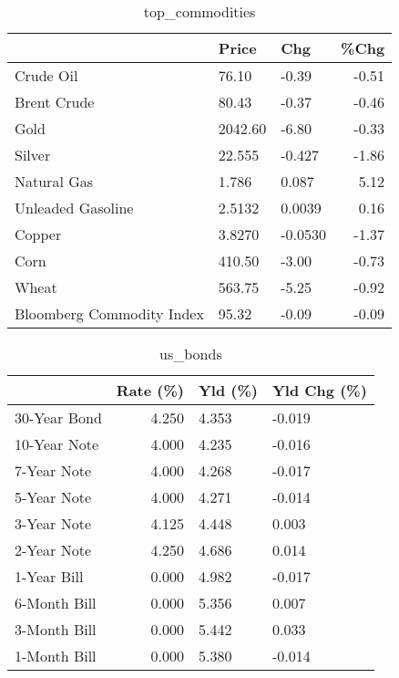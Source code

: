 \documentclass{article}%
\begin{document}
\begin{table}[htbp]%
\caption{top\_commodities}%
\centering%
\begin{adjustbox}{width=1\textwidth}%
\begin{tabular}{lllr}
\toprule
                          &   Price &     Chg &  \%Chg \\
\midrule
               Crude Oil  &   76.10 &   -0.39 & -0.51 \\
             Brent Crude  &   80.43 &   -0.37 & -0.46 \\
                    Gold  & 2042.60 &   -6.80 & -0.33 \\
                  Silver  &  22.555 &  -0.427 & -1.86 \\
             Natural Gas  &   1.786 &   0.087 &  5.12 \\
       Unleaded Gasoline  &  2.5132 &  0.0039 &  0.16 \\
                  Copper  &  3.8270 & -0.0530 & -1.37 \\
                    Corn  &  410.50 &   -3.00 & -0.73 \\
                   Wheat  &  563.75 &   -5.25 & -0.92 \\
Bloomberg Commodity Index &   95.32 &   -0.09 & -0.09 \\
\bottomrule
\end{tabular}
%
\end{adjustbox}%
\end{table}

%


\begin{table}[htbp]%
\caption{us\_bonds}%
\centering%
\begin{adjustbox}{width=1\textwidth}%
\begin{tabular}{lrll}
\toprule
             &  Rate (\%) & Yld (\%) & Yld Chg (\%) \\
\midrule
30-Year Bond &     4.250 &   4.353 &      -0.019 \\
10-Year Note &     4.000 &   4.235 &      -0.016 \\
 7-Year Note &     4.000 &   4.268 &      -0.017 \\
 5-Year Note &     4.000 &   4.271 &      -0.014 \\
 3-Year Note &     4.125 &   4.448 &       0.003 \\
 2-Year Note &     4.250 &   4.686 &       0.014 \\
 1-Year Bill &     0.000 &   4.982 &      -0.017 \\
6-Month Bill &     0.000 &   5.356 &       0.007 \\
3-Month Bill &     0.000 &   5.442 &       0.033 \\
1-Month Bill &     0.000 &   5.380 &      -0.014 \\
\bottomrule
\end{tabular}
%
\end{adjustbox}%
\end{table}
\end{document}
